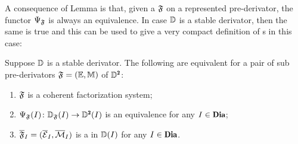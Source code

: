 A consequence of Lemma  is that, given a \dfs $\mathfrak{F}$ on a represented pre-derivator, the functor $\Psi_{\mathfrak{F}}$ is always an equivalence. In case $\mathbb{D}$ is a stable derivator, then the same is true and this can be used to give a very compact definition of {\dfs}s in this case:
\begin{theorem}\label{stable_equv_orth}
Suppose $\mathbb{D}$ is a stable derivator. The following are equivalent for a pair of sub pre-derivators $\mathfrak{F}=(\mathbb E,\mathbb M)$  of $\D^{\due}$:
\begin{enumerate}%
\item $\mathfrak{F}$ is a coherent factorization system;
\item $\Psi_\F(I)\colon \D_\F(I)\to \D^{\due}(I)$ is an equivalence for any $I\in \Dia$;
\item $\overline{\mathfrak{F}}_I=(\overline{\mathcal{E}}_I,\overline{\mathcal{M}}_I)$ is a \hfs in $\mathbb{D}(I)$ for any $I\in\Dia$.
\end{enumerate}
\end{theorem}
